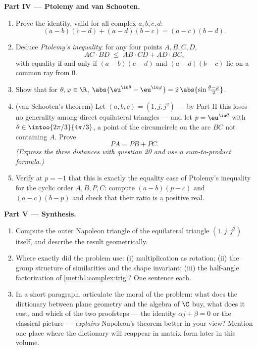 \begin{problem}
\medskip
\noindent\textbf{Part IV --- Ptolemy and van Schooten.}
\begin{enumerate}[resume]
  \item Prove the identity, valid for all complex $a, b, c, d$:
        \[
        (a - b)(c - d) + (a - d)(b - c) = (a - c)(b - d) .
        \]
  \item Deduce \emph{Ptolemy's inequality}: for any four points $A, B, C, D$,
        \[
        AC \cdot BD \;\leq\; AB \cdot CD + AD \cdot BC ,
        \]
        with equality if and only if $(a-b)(c-d)$ and
        $(a-d)(b-c)$ lie on a common ray from $0$.
  \item Show that for $\theta, \varphi \in \R$,
        $\abs{\eu^{\iu\theta} - \eu^{\iu\varphi}} =
        2\,\abs{\sin\frac{\theta - \varphi}2}$.
  \item (van Schooten's theorem) Let
        $(a, b, c) = (1, j, j^2)$ --- by Part II this loses no
        generality among direct equilateral triangles --- and let
        $p = \eu^{\iu\theta}$ with $\theta \in
        \intoo{2\pi/3}{4\pi/3}$, a point of the circumcircle on the
        arc $BC$ not containing $A$. Prove
        \[
        PA = PB + PC .
        \]
        \emph{(Express the three distances with question 20 and use
        a sum-to-product formula.)}
  \item Verify at $p = -1$ that this is exactly the equality case
        of Ptolemy's inequality for the cyclic order $A, B, P, C$:
        compute $(a - b)(p - c)$ and $(a - c)(b - p)$ and check
        that their ratio is a positive real.
\end{enumerate}

\medskip
\noindent\textbf{Part V --- Synthesis.}
\begin{enumerate}[resume]
  \item Compute the outer Napoleon triangle of the equilateral
        triangle $(1, j, j^2)$ itself, and describe the result
        geometrically.
  \item Where exactly did the problem use: (i) multiplication as
        rotation; (ii) the group structure of similarities and the
        shape invariant; (iii) the half-angle factorization of
        \cref{met:b1:complex:trig}? One sentence each.
  \item In a short paragraph, articulate the moral of the problem:
        what does the dictionary between plane geometry and the
        algebra of $\C$ buy, what does it cost, and which of the
        two proofsteps --- the identity $\alpha j + \beta = 0$ or
        the classical picture --- \emph{explains} Napoleon's
        theorem better in your view? Mention one place where the
        dictionary will reappear in matrix form later in this
        volume.
\end{enumerate}
\end{problem}
